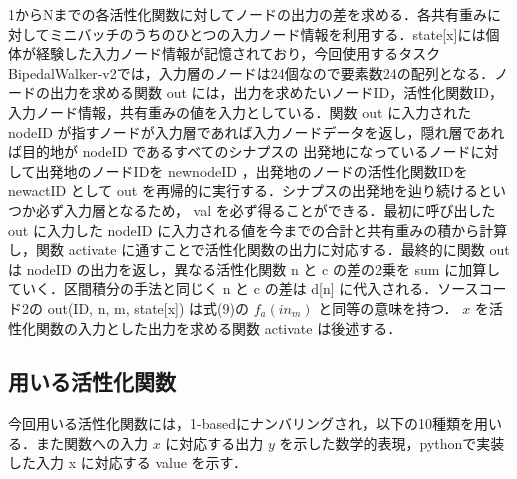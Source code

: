 1からNまでの各活性化関数に対してノードの出力の差を求める．各共有重みに対してミニバッチのうちのひとつの入力ノード情報を利用する．state[x]には個体が経験した入力ノード情報が記憶されており，今回使用するタスクBipedalWalker-v2\cite{OpenAI}では，入力層のノードは24個なので要素数24の配列となる．ノードの出力を求める関数 out には，出力を求めたいノードID，活性化関数ID，入力ノード情報，共有重みの値を入力としている．関数 out に入力された nodeID が指すノードが入力層であれば入力ノードデータを返し，隠れ層であれば目的地が nodeID であるすべてのシナプスの 出発地になっているノードに対して出発地のノードIDを newnodeID ，出発地のノードの活性化関数IDを newactID として out を再帰的に実行する．シナプスの出発地を辿り続けるといつか必ず入力層となるため， val を必ず得ることができる．最初に呼び出した out に入力した nodeID に入力される値を今までの合計と共有重みの積から計算し，関数 activate に通すことで活性化関数の出力に対応する．最終的に関数 out は nodeID の出力を返し，異なる活性化関数 n と c の差の2乗を sum に加算していく．区間積分の手法と同じく n と c の差は d[n] に代入される．ソースコード2の out(ID, n, m, state[x]) は式(9)の $ f_{a}(in_{m}) $ と同等の意味を持つ． $ x $ を活性化関数の入力とした出力を求める関数 activate は後述する．

\subsection{用いる活性化関数}
今回用いる活性化関数には，1-basedにナンバリングされ，以下の10種類を用いる．また関数への入力 $ x $ に対応する出力 $ y $ を示した数学的表現，pythonで実装した入力 x に対応する value を示す．

